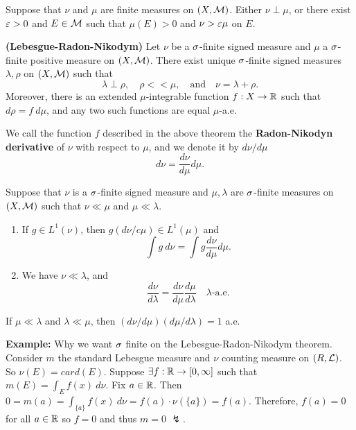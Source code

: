 \vs

\begin{lem}
Suppose that $\nu$ and $\mu$ are finite measures on $(X, \mathcal{M})$. Either $\nu \perp \mu$, or there exist $\varepsilon > 0$ and $E\in \mathcal{M}$ such that $\mu(E) > 0$ and $\nu > \varepsilon \mu$ on $E$.
\end{lem}

\vs

\begin{thm}\textbf{(Lebesgue-Radon-Nikodym)}
Let $\nu$ be a $\sigma$-finite signed measure and $\mu$ a $\sigma$-finite positive measure on $(X, \mathcal{M})$. There exist unique $\sigma$-finite signed measures $\lambda, \rho$ on $(X, \mathcal{M})$ such that
\[\lambda\perp\rho,\quad \rho << \mu, \quad \text{and}\quad \nu = \lambda + \rho.\]
Moreover, there is an extended $\mu$-integrable function $f:X\rightarrow \mathbb{R}$ such that $d\rho = f\ d\mu$, and any two such functions are equal $\mu$-a.e.
\end{thm}

\vs

\dfn We call the function $f$ described in the above theorem the \textbf{Radon-Nikodyn derivative} of $\nu$ with respect to $\mu$, and we denote it by $d\nu/d\mu$
\[d\nu = \frac{d\nu}{d\mu}d\mu.\]

\vs

\begin{prop}
Suppose that $\nu$ is a $\sigma$-finite signed measure and $\mu, \lambda$ are $\sigma$-finite measures on $(X, \mathcal{M})$ such that $\nu \ll \mu$ and $\mu\ll\lambda$.
\begin{enumerate}[\hspace{1em}(a)]
    \item If $g\in L^1(\nu)$, then $g(d\nu/c\mu)\in L^1(\mu)$ and
    \[\int g\ d\nu = \int g\frac{d\nu}{d\mu} d\mu.\]
    \item We have $\nu \ll \lambda$, and
    \[\frac{d\nu}{d\lambda} = \frac{d\nu}{d\mu}\frac{d\mu}{d\lambda}\quad \lambda\text{-a.e.}\]
\end{enumerate}
\end{prop}

\vs

\begin{cor}
If $\mu\ll\lambda$ and $\lambda \ll \mu$, then $(d\nu/d\mu)(d\mu/d\lambda) = 1$ a.e.
\end{cor}

\vs

\textbf{Example:} Why we want $\sigma$ finite on the Lebesgue-Radon-Nikodym theorem. Consider $m$ the standard Lebesgue measure and $\nu$ counting measure on $(R, \mathcal{L})$. So $\nu(E) = card(E)$. Suppose $\exists f:\mathbb{R}\rightarrow [0,\infty]$ such that $m(E) = \int_E f(x)\ d\nu$. Fix $a\in \mathbb{R}$. Then $0 = m({a}) = \int_{\{a\}} f(x)\ d\nu = f(a)\cdot\nu(\{a\}) = f(a)$. Therefore, $f(a) = 0$ for all $a\in \mathbb{R}$ so $f = 0$ and thus $m = 0$ $\lightning$. 

